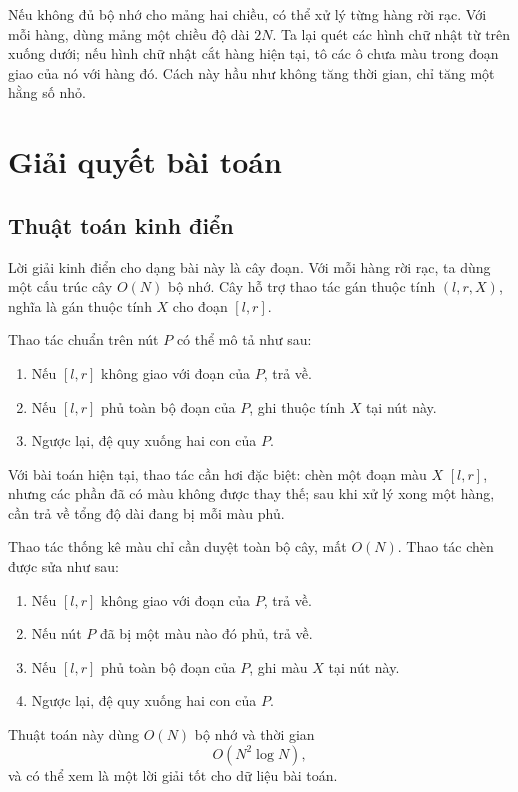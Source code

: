 \documentclass[11pt]{article}
\begin{document}
Nếu không đủ bộ nhớ cho mảng hai chiều, có thể xử lý từng hàng rời rạc. Với
mỗi hàng, dùng mảng một chiều độ dài \(2N\). Ta lại quét các hình chữ nhật từ
trên xuống dưới; nếu hình chữ nhật cắt hàng hiện tại, tô các ô chưa màu trong
đoạn giao của nó với hàng đó. Cách này hầu như không tăng thời gian, chỉ tăng
một hằng số nhỏ.

\section{Giải quyết bài toán}

\subsection{Thuật toán kinh điển}

Lời giải kinh điển cho dạng bài này là cây đoạn. Với mỗi hàng rời rạc, ta
dùng một cấu trúc cây \(O(N)\) bộ nhớ. Cây hỗ trợ thao tác gán thuộc tính
\((l,r,X)\), nghĩa là gán thuộc tính \(X\) cho đoạn \([l,r]\).

Thao tác chuẩn trên nút \(P\) có thể mô tả như sau:

\begin{enumerate}
  \item Nếu \([l,r]\) không giao với đoạn của \(P\), trả về.
  \item Nếu \([l,r]\) phủ toàn bộ đoạn của \(P\), ghi thuộc tính \(X\) tại
  nút này.
  \item Ngược lại, đệ quy xuống hai con của \(P\).
\end{enumerate}

Với bài toán hiện tại, thao tác cần hơi đặc biệt: chèn một đoạn màu \(X\)
\([l,r]\), nhưng các phần đã có màu không được thay thế; sau khi xử lý xong
một hàng, cần trả về tổng độ dài đang bị mỗi màu phủ.

Thao tác thống kê màu chỉ cần duyệt toàn bộ cây, mất \(O(N)\). Thao tác chèn
được sửa như sau:

\begin{enumerate}
  \item Nếu \([l,r]\) không giao với đoạn của \(P\), trả về.
  \item Nếu nút \(P\) đã bị một màu nào đó phủ, trả về.
  \item Nếu \([l,r]\) phủ toàn bộ đoạn của \(P\), ghi màu \(X\) tại nút này.
  \item Ngược lại, đệ quy xuống hai con của \(P\).
\end{enumerate}

Thuật toán này dùng \(O(N)\) bộ nhớ và thời gian
\[
  O(N^2\log N),
\]
và có thể xem là một lời giải tốt cho dữ liệu bài toán.
\end{document}
